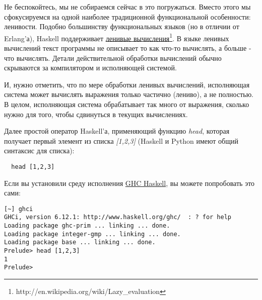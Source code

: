 Не беспокойтесь, мы не собираемся сейчас в это погружаться. 
Вместо этого мы сфокусируемся на одной наиболее 
традиционной функциональной особенности: ленивости. Подобно 
большинству функциональных языков (но в отличии от Erlang'а), Haskell 
поддерживает \href{http://en.wikipedia.org/wiki/Lazy\_evaluation}{ленивые вычисления}\footnote[5]{http://en.wikipedia.org/wiki/Lazy\_evaluation}. 
В языке ленивых вычислений текст программы не описывает то как 
что-то вычислять, а больше - что вычислять. Детали действительной 
обработки вычислений обычно скрываются за компилятором и исполняющей системой.


И, нужно отметить, что по мере обработки ленивых вычислений, 
исполняющая система может вычислять выражения только частично (лениво), 
а не полностью. В целом, исполняющая система обрабатывает так много от 
выражения, сколько нужно для того, чтобы сдвинуться в текущих вычислениях. 


Далее простой оператор Haskell'а, применяющий 
функцию \textit{head}, которая получает первый элемент из списка \textit{[1,2,3]} (Haskell и 
Python имеют общий синтаксис для списка): 

 \begin{verbatim}
  head [1,2,3]
\end{verbatim} 


Если вы установили среду исполнения 
\href{http://www.haskell.org/ghc/}{GHC Haskell}, вы можете 
попробовать это сами:

 \begin{verbatim}
[~] ghci
GHCi, version 6.12.1: http://www.haskell.org/ghc/  : ? for help
Loading package ghc-prim ... linking ... done.
Loading package integer-gmp ... linking ... done.
Loading package base ... linking ... done.
Prelude> head [1,2,3]
1
Prelude>
\end{verbatim} 


